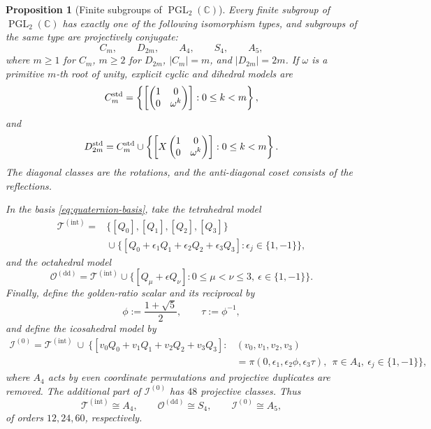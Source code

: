 \documentclass[11pt,letterpaper,onecolumn]{article}
\theoremstyle{plain}
\newtheorem{proposition}[proposition]{Proposition}
\theoremstyle{definition}
\theoremstyle{remark}
\newcommand{\TetInt}{{\mathcal T^{(\mathrm{int})}}}
\newcommand{\OctDD}{{\mathcal O^{(\mathrm{dd})}}}
\newcommand{\IcoZero}{{\mathcal I^{(0)}}}
\newcommand{\PGL}{\operatorname{PGL}}
\begin{document}
\begin{proposition}[Finite subgroups of \(\PGL_2(\mathbb C)\)]
\label{prop:finite-pgl2-classification}
Every finite subgroup of \(\PGL_2(\mathbb C)\) has exactly one of the following
isomorphism types, and subgroups of the same type are projectively conjugate:
\[
  C_m,\qquad D_{2m},\qquad A_4,\qquad S_4,\qquad A_5,
\]
where \(m\ge1\) for \(C_m\), \(m\ge2\) for \(D_{2m}\),
\(|C_m|=m\), and \(|D_{2m}|=2m\).  If \(\omega\) is a primitive
\(m\)-th root of unity, explicit cyclic and dihedral models are
\[
 C_m^{\rm std}
 =
 \left\{
   \left[\begin{pmatrix}1&0\\0&\omega^k\end{pmatrix}\right]:
   0\le k<m
 \right\},
\]
and
\[
 D_{2m}^{\rm std}
 =
 C_m^{\rm std}
 \cup
 \left\{
   \left[
     X\begin{pmatrix}1&0\\0&\omega^k\end{pmatrix}
   \right]:
   0\le k<m
 \right\}.
\]
The diagonal classes are the rotations, and the anti-diagonal coset
consists of the reflections.

In the basis \cref{eq:quaternion-basis}, take the tetrahedral model
\begin{equation}
\begin{aligned}
 \TetInt
 ={}&
 \{[Q_0],[Q_1],[Q_2],[Q_3]\}\\
 &{}\cup
 \{[Q_0+\epsilon_1Q_1+\epsilon_2Q_2+\epsilon_3Q_3]:
       \epsilon_j\in\{1,-1\}\},
\end{aligned}
\label{eq:tetrahedral-domain}
\end{equation}
and the octahedral model
\begin{equation}
 \OctDD
 =
 \TetInt
 \cup
 \{[Q_\mu+\epsilon Q_\nu]:
       0\le\mu<\nu\le3,\ \epsilon\in\{1,-1\}\}.
 \label{eq:octahedral-domain}
\end{equation}
Finally, define the golden-ratio scalar and its reciprocal by
\[
  \phi:=\frac{1+\sqrt5}{2},
  \qquad
  \tau:=\phi^{-1},
\]
and define the icosahedral model by
\begin{equation}
\begin{aligned}
 \IcoZero
 =\TetInt\ \cup\
 \bigl\{[v_0Q_0+v_1Q_1+v_2Q_2+v_3Q_3]:{}&
 (v_0,v_1,v_2,v_3)\\
 &{}=\pi(0,\epsilon_1,\epsilon_2\phi,\epsilon_3\tau),\
 \ \pi\in A_4,\ \epsilon_j\in\{1,-1\}\bigr\},
\end{aligned}
\label{eq:icosahedral-domain}
\end{equation}
where \(A_4\) acts by even coordinate permutations and projective
duplicates are removed.  The additional part of \(\IcoZero\) has
\(48\) projective classes.  Thus
\[
  \TetInt\cong A_4,\qquad
  \OctDD\cong S_4,\qquad
  \IcoZero\cong A_5,
\]
of orders \(12,24,60\), respectively.
\end{proposition}
\end{document}
